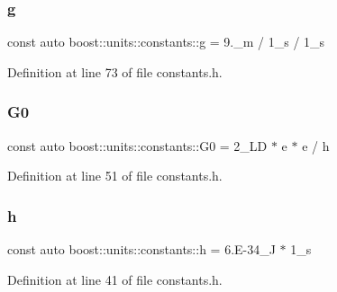 \hypertarget{namespaceboost_1_1units_1_1constants_a1c1bcbea7888f1bed4431f0ec45b57f5}{}\label{namespaceboost_1_1units_1_1constants_a1c1bcbea7888f1bed4431f0ec45b57f5} 
\subsubsection{\texorpdfstring{g}{g}}
{\footnotesize\ttfamily const auto boost\+::units\+::constants\+::g = 9.\+\_\+m / 1\+\_\+s / 1\+\_\+s}



Definition at line 73 of file constants.\+h.

\hypertarget{namespaceboost_1_1units_1_1constants_a3d9777be8bc870b31fd610a8970cdf27}{}\label{namespaceboost_1_1units_1_1constants_a3d9777be8bc870b31fd610a8970cdf27} 
\subsubsection{\texorpdfstring{G0}{G0}}
{\footnotesize\ttfamily const auto boost\+::units\+::constants\+::\+G0 = 2\+\_\+\+L\+D $\ast$ e $\ast$ e / h}



Definition at line 51 of file constants.\+h.

\hypertarget{namespaceboost_1_1units_1_1constants_a744f5a50efb6701fcbde9527affd7776}{}\label{namespaceboost_1_1units_1_1constants_a744f5a50efb6701fcbde9527affd7776} 
\subsubsection{\texorpdfstring{h}{h}}
{\footnotesize\ttfamily const auto boost\+::units\+::constants\+::h = 6.\+E-\/34\+\_\+\+J $\ast$ 1\+\_\+s}



Definition at line 41 of file constants.\+h.

\hypertarget{namespaceboost_1_1units_1_1constants_a0203c96d139e639b8ee536cbc010c7bd}{}\label{namespaceboost_1_1units_1_1constants_a0203c96d139e639b8ee536cbc010c7bd} 
